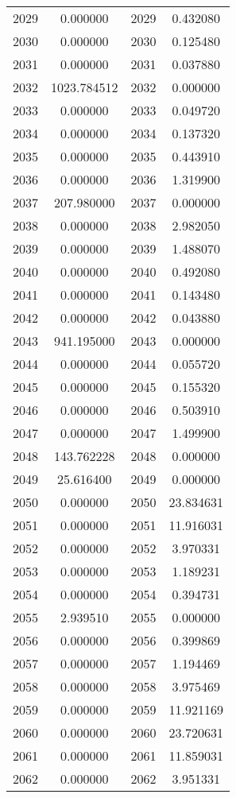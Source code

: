 \documentclass[12pt]{article}
\begin{document}
\begin{longtable}{@{}cccc@{}}
2029 & 0.000000 & 2029 & 0.432080 \\
2030 & 0.000000 & 2030 & 0.125480 \\
2031 & 0.000000 & 2031 & 0.037880 \\
2032 & 1023.784512 & 2032 & 0.000000 \\
2033 & 0.000000 & 2033 & 0.049720 \\
2034 & 0.000000 & 2034 & 0.137320 \\
2035 & 0.000000 & 2035 & 0.443910 \\
2036 & 0.000000 & 2036 & 1.319900 \\
2037 & 207.980000 & 2037 & 0.000000 \\
2038 & 0.000000 & 2038 & 2.982050 \\
2039 & 0.000000 & 2039 & 1.488070 \\
2040 & 0.000000 & 2040 & 0.492080 \\
2041 & 0.000000 & 2041 & 0.143480 \\
2042 & 0.000000 & 2042 & 0.043880 \\
2043 & 941.195000 & 2043 & 0.000000 \\
2044 & 0.000000 & 2044 & 0.055720 \\
2045 & 0.000000 & 2045 & 0.155320 \\
2046 & 0.000000 & 2046 & 0.503910 \\
2047 & 0.000000 & 2047 & 1.499900 \\
2048 & 143.762228 & 2048 & 0.000000 \\
2049 & 25.616400 & 2049 & 0.000000 \\
2050 & 0.000000 & 2050 & 23.834631 \\
2051 & 0.000000 & 2051 & 11.916031 \\
2052 & 0.000000 & 2052 & 3.970331 \\
2053 & 0.000000 & 2053 & 1.189231 \\
2054 & 0.000000 & 2054 & 0.394731 \\
2055 & 2.939510 & 2055 & 0.000000 \\
2056 & 0.000000 & 2056 & 0.399869 \\
2057 & 0.000000 & 2057 & 1.194469 \\
2058 & 0.000000 & 2058 & 3.975469 \\
2059 & 0.000000 & 2059 & 11.921169 \\
2060 & 0.000000 & 2060 & 23.720631 \\
2061 & 0.000000 & 2061 & 11.859031 \\
2062 & 0.000000 & 2062 & 3.951331 \\

\end{longtable}
\end{document}
